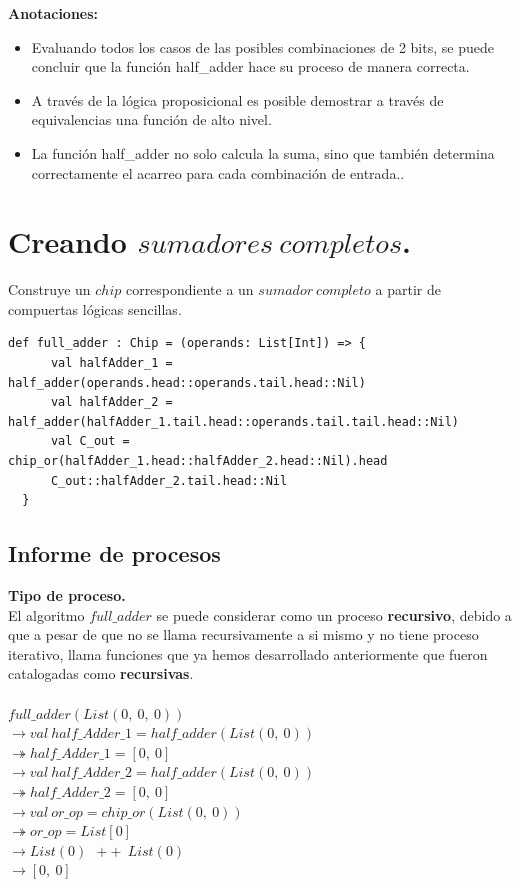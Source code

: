 \documentclass[12pt, a4paper]{article}
\begin{document}
\textbf{Anotaciones:}
\begin{itemize}
  \item Evaluando todos los casos de las posibles combinaciones de 2 bits, se puede concluir que la función half\_adder hace su proceso de manera correcta.
  \item A través de la lógica proposicional es posible demostrar a través de equivalencias una función de alto nivel.
  \item La función half\_adder no solo calcula la suma, sino que también determina correctamente el acarreo para cada combinación de entrada..
\end{itemize}
\newpage
\section{Creando $sumadores \ completos$.}
Construye un $chip$ correspondiente a un $sumador \ completo$ a partir de compuertas lógicas sencillas. \\
\begin{lstlisting}[style=scalaStyle, caption=Sumador completo implementado]
  def full_adder : Chip = (operands: List[Int]) => {
      val halfAdder_1 = half_adder(operands.head::operands.tail.head::Nil) 
      val halfAdder_2 = half_adder(halfAdder_1.tail.head::operands.tail.tail.head::Nil) 
      val C_out = chip_or(halfAdder_1.head::halfAdder_2.head::Nil).head 
      C_out::halfAdder_2.tail.head::Nil 
  }
\end{lstlisting}
\subsection{Informe de procesos}
\textbf{Tipo de proceso.} \\
El algoritmo $full\_adder$ se puede considerar como un proceso \textbf{recursivo}, debido a que a pesar de que no se llama recursivamente a si mismo y no tiene proceso iterativo, llama funciones que ya hemos desarrollado anteriormente que fueron catalogadas como \textbf{recursivas}. \\ \\ 
$ full\_adder(List(0,~0,~0)) $ \\
$ \rightarrow val~half\_Adder\_1 = half\_adder(List(0,~0)) $ \\
$ \twoheadrightarrow half\_Adder\_1 = [0,~0] $  \\
$ \rightarrow val~half\_Adder\_2 = half\_adder(List(0,~0)) $ \\
$ \twoheadrightarrow half\_Adder\_2 = [0,~0] $ \\
$ \rightarrow val~or\_op = chip\_or(List(0,~0)) $ \\
$ \twoheadrightarrow or\_op = List[0] $ \\
$ \rightarrow List(0)~~++~~List(0) $ \\
$ \rightarrow [0,~0] $ \\
\end{document}
